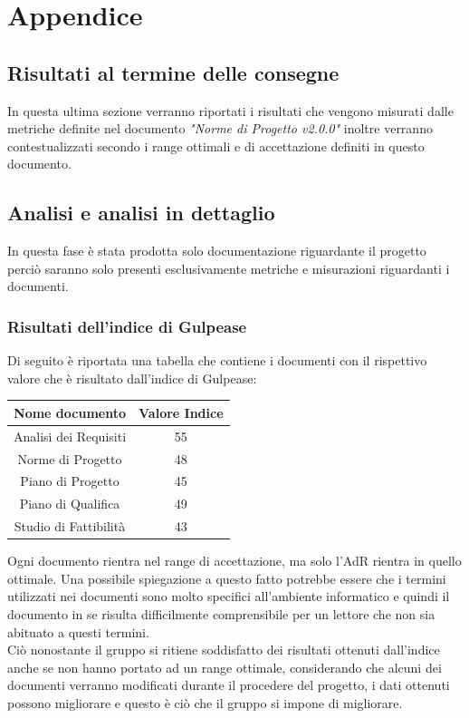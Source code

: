 \documentclass[12pt,a4paper,titlepage]{article}
\begin{document}
	\newpage
	\appendix
	\section{Appendice}
	\subsection{Risultati al termine delle consegne}
	In questa ultima sezione verranno riportati i risultati che vengono misurati dalle metriche definite nel documento \textit{"Norme di Progetto v2.0.0"} inoltre verranno contestualizzati secondo i range ottimali e di accettazione definiti in questo documento.\\
	
	\subsection{Analisi e analisi in dettaglio}
	
	In questa fase è stata prodotta solo documentazione riguardante il progetto perciò saranno solo presenti esclusivamente metriche e misurazioni riguardanti i documenti.\\
	
	\subsubsection{Risultati dell'indice di Gulpease}
	Di seguito è riportata una tabella che contiene i documenti con il rispettivo valore che è risultato dall'indice di Gulpease:
	\begin{tabular}{|c|c|}
    	{\textbf{Nome documento}}&{\textbf{Valore Indice}}\\
    	\hline
    	Analisi dei Requisiti & 55\\
    	\hline
    	Norme di Progetto & 48\\
    	\hline
    	Piano di Progetto & 45\\
    	\hline
    	Piano di Qualifica & 49\\
    	\hline
    	Studio di Fattibilità & 43\\
    \end{tabular}
    Ogni documento rientra nel range di accettazione, ma solo l'AdR rientra in quello ottimale. Una possibile spiegazione a questo fatto potrebbe essere che i termini utilizzati nei documenti sono molto specifici all'ambiente informatico e quindi il documento in se risulta difficilmente comprensibile 
    per un lettore che non sia abituato a questi termini.\\
    Ciò nonostante il gruppo si ritiene soddisfatto dei risultati ottenuti dall'indice anche se non hanno portato ad un range ottimale, considerando che alcuni dei documenti verranno modificati durante il procedere del progetto, i dati ottenuti possono migliorare e questo è ciò che il gruppo si impone di migliorare.\\
    
\end{document}

